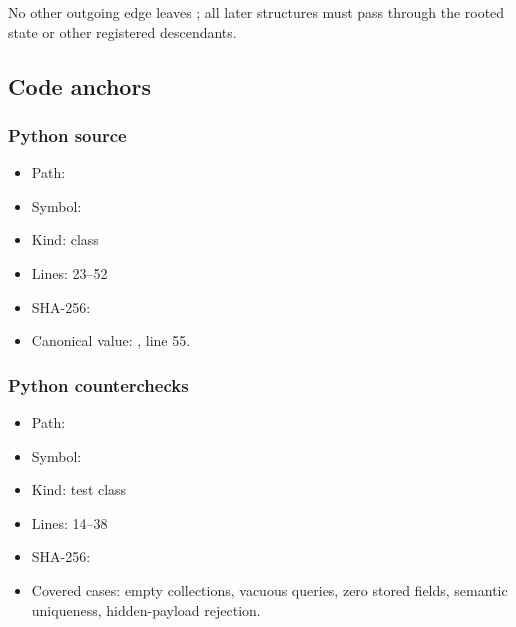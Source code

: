 No other outgoing edge leaves \texttt{\protect{}}; all later structures must
pass through the rooted state or other registered descendants.

\subsection{Code anchors}\label{code-anchors-2}

\subsubsection{Python source}\label{python-source-2}

\begin{itemize}
\tightlist
\item
  Path:
  \texttt{\protect{}}
\item
  Symbol: \texttt{\protect{}}
\item
  Kind: class
\item
  Lines: 23--52
\item
  SHA-256:
  \texttt{\protect{}}
\item
  Canonical value: \texttt{\protect{}}, line 55.
\end{itemize}

\subsubsection{Python counterchecks}\label{python-counterchecks-2}

\begin{itemize}
\tightlist
\item
  Path:
  \texttt{\protect{}}
\item
  Symbol: \texttt{\protect{}}
\item
  Kind: test class
\item
  Lines: 14--38
\item
  SHA-256:
  \texttt{\protect{}}
\item
  Covered cases: empty collections, vacuous queries, zero stored fields,
  semantic uniqueness, hidden-payload rejection.
\end{itemize}

